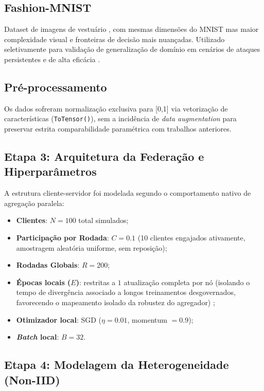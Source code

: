 \subsection{Fashion-MNIST}
Dataset de imagens de vestuário \cite{Xiao2017}, com mesmas dimensões 
do MNIST mas maior complexidade visual e fronteiras de decisão mais 
nuançadas. Utilizado seletivamente para validação de generalização de domínio em cenários de ataques persistentes e de alta eficácia
\cite{Kairouz2021}.

\subsection{Pré-processamento}
Os dados sofreram normalização exclusiva para [0,1] via vetorização de características (\texttt{ToTensor()}), sem a incidência de \textit{data augmentation} para preservar estrita comparabilidade paramétrica com trabalhos anteriores.

\subsection{Etapa 3: Arquitetura da Federação e Hiperparâmetros}

A estrutura cliente-servidor foi modelada segundo o comportamento nativo de agregação paralela:
\begin{itemize}
    \item \textbf{Clientes}: $N = 100$ total simulados;
    \item \textbf{Participação por Rodada}: $C = 0.1$ (10 clientes engajados ativamente, amostragem aleatória uniforme, sem reposição);
    \item \textbf{Rodadas Globais}: $R = 200$;
    \item \textbf{Épocas locais ($E$)}: restritas a $1$ atualização completa por nó (isolando o tempo de divergência associado a longos treinamentos desgovernados, favorecendo o mapeamento isolado da robustez do agregador) \cite{Chen2023};
    \item \textbf{Otimizador local}: SGD ($\eta = 0.01$, momentum $= 0.9$);
    \item \textbf{\textit{Batch} local}: $B = 32$.
\end{itemize}

\subsection{Etapa 4: Modelagem da Heterogeneidade (Non-IID)}

